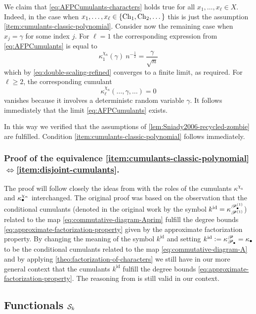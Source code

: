 \documentclass[12pt,usenames,dvipsnames,svgnames,table]{amsart}
\begin{document}
We claim that \eqref{eq:AFPCumulants-characters} holds true for all $x_1,\dots,x_\ell\in X$.
Indeed, in the case when $x_1,\dots,x_\ell\in\{\operatorname{Ch}_1,\operatorname{Ch}_2,\dots\}$ this is just the assumption 
\ref{item:cumulants-classic-polynomial}. Consider now the remaining case when $x_j=\gamma$
for some index $j$. For $\ell=1$ the corresponding expression  from  \eqref{eq:AFPCumulants}
is equal to 
\[
\kappa^{\chi_n}_{1}(\gamma)\ 
n^{- \frac{1}{2}} =\frac{\gamma}{\sqrt{n}}
\]
which by \eqref{eq:double-scaling-refined} converges to a finite limit, as required.
For $\ell\geq 2$, the corresponding cumulant 
\[ \kappa^{\chi_n}_{\ell}(\dots,\gamma,\dots)=0\]
vanishes because it involves a deterministc random variable $\gamma$.
It follows immediately that the limit \eqref{eq:AFPCumulants} exists.

In this way we verified that the assumptions of \cref{lem:Sniady2006-recycled-zombie} are fulfilled.
Condition \ref{item:cumulants-classic-polynomial} follows immediately.

\subsubsection{Proof of the equivalence \ref{item:cumulants-classic-polynomial}$\iff$\ref{item:disjoint-cumulants}.}
The proof will follow closely the ideas from \cite[Section 4.7]{Sniady2006c}
with the roles of the cumulants $\kappa^{\chi_n}$ and $\kappa^{\chi_n}_{\bullet}$ interchanged.
The original proof was based on the observation that the conditional cumulants 
(denoted in the original work \cite{Sniady2006c} by the symbol $k^{\operatorname{id}}=\kappa_{\mathscr{P}^{(1)}}^{\mathscr{P}_\bullet^{(1)}}$)
related to the map \eqref{eq:commutative-diagram-Aprim} fulfill the degree bounds \eqref{eq:approximate-factorization-property}
given by the approximate factorization property.
By changing the meaning of the symbol $k^{\operatorname{id}}$ and setting 
$k^{\operatorname{id}}:=\kappa^{\mathscr{P}}_{\mathscr{P}_\bullet}=\kappa_{\bullet}$ 
to be the conditional cumulants related to the map \eqref{eq:commutative-diagram-A}
and by applying \cref{theo:factorization-of-characters}
we still have in our more general context that the cumulants $k^{\operatorname{id}}$ fulfill the degree bounds \eqref{eq:approximate-factorization-property}.
The reasoning from \cite[Section 4.7]{Sniady2006c} is still valid in our context.

\subsection{Functionals $\mathcal{S}_k$}
\end{document}
